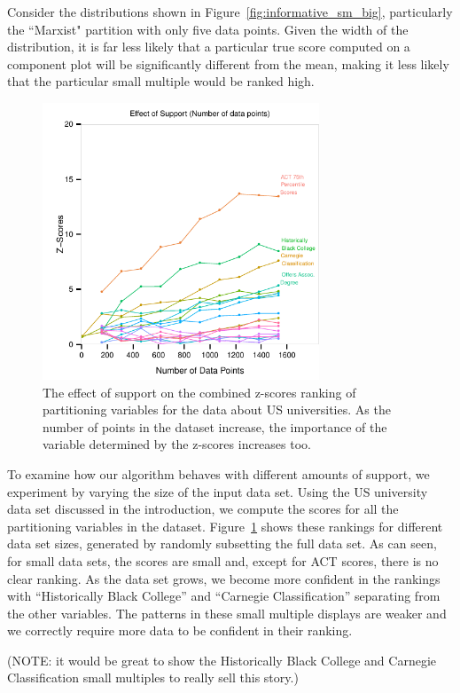 Consider the distributions shown in Figure~\ref{fig:informative_sm_big}, particularly the ``Marxist" partition with only five data points. Given the width of the distribution, it is far less likely that a particular true score computed on a component plot will be significantly different from the mean, making it less likely that the particular small multiple would be ranked high.
\begin{figure}
\centering
\includegraphics[width=3.25in,height=3.25in]{images/support-nogrid.pdf}
  \caption{The effect of support on the combined z-scores ranking of partitioning variables for the data about US universities. As the number of points in the dataset increase, the importance of the variable determined by the z-scores increases too. }
 \label{fig:support}
\end{figure}

To examine how our algorithm behaves with different amounts of support, we experiment by varying the size of the input data set. Using the US university data set discussed in the introduction, we compute the scores for all the partitioning variables in the dataset. Figure~\ref{fig:support} shows these rankings for different data set sizes, generated by randomly subsetting the full data set.
As can seen, for small data sets, the scores are small and, except for ACT scores, there is no clear ranking. As the data set grows, we become more confident in the rankings with ``Historically Black College'' and ``Carnegie Classification'' separating from the other variables. The patterns in these small multiple displays are weaker and we correctly require more data to be confident in their ranking.

(NOTE: it would be great to show the Historically Black College and Carnegie Classification small multiples to really sell this story.) 

